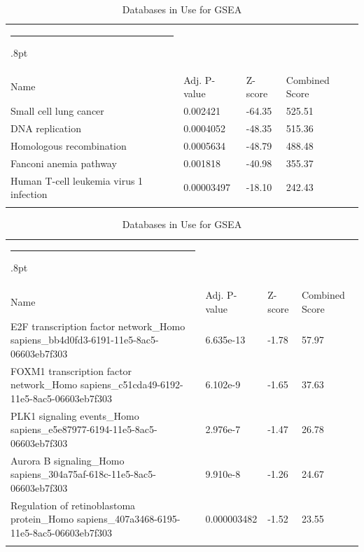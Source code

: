 \documentclass[3p,authoryear,preprint,12pt]{elsarticle}
\makeatletter
\def\hlinewd#1{%
  \noalign{\ifnum0=`}\fi\hrule \@height #1%
  \futurelet\reserved@a\@xhline}
\def\tbltoprule{\hlinewd{.8pt}\\[-12pt]}
\def\tblbottomrule{\noalign{\vspace*{6pt}}\hline\noalign{\vspace*{2pt}}}
\def\tblmidrule{\noalign{\vspace*{6pt}}\hline\noalign{\vspace*{2pt}}}
\makeatother
\begin{document}
\begin{table}[!htbp]
	\caption{{Databases in Use for GSEA} }
	\label{tw-de478ae31cc6}
	\def\arraystretch{1}
	\ignorespaces 
	\centering 
	\begin{tabulary}{\linewidth}{p{\dimexpr.65\tabcolsep}p{\dimexpr.15\tabcolsep}p{\dimexpr.1\tabcolsep}p{\dimexpr.1\tabcolsep}}
		\tbltoprule Name & Adj. P-value & Z-score & Combined Score\\
		\tblmidrule
Small cell lung cancer & 0.002421 & -64.35 & 525.51 \\
DNA replication & 0.0004052 & -48.35 & 515.36 \\
Homologous recombination & 0.0005634 & -48.79 & 488.48 \\
Fanconi anemia pathway & 0.001818 & -40.98 & 355.37 \\
Human T-cell leukemia virus 1 infection & 0.00003497 & -18.10 & 242.43 \\
		\tblbottomrule
	\end{tabulary}\par 
\end{table}
\begin{table}[!htbp]
	\caption{{Databases in Use for GSEA} }
	\label{tw-de478ae31cc6}
	\def\arraystretch{1}
	\ignorespaces 
	\centering 
	\begin{tabulary}{\linewidth}{p{\dimexpr.65\tabcolsep}p{\dimexpr.15\tabcolsep}p{\dimexpr.1\tabcolsep}p{\dimexpr.1\tabcolsep}}
		\tbltoprule Name & Adj. P-value & Z-score & Combined Score\\
		\tblmidrule
E2F transcription factor network\_Homo sapiens\_bb4d0fd3-6191-11e5-8ac5-06603eb7f303 & 6.635e-13 & -1.78 & 57.97 \\
FOXM1 transcription factor network\_Homo sapiens\_c51cda49-6192-11e5-8ac5-06603eb7f303 & 6.102e-9 & -1.65 & 37.63 \\
PLK1 signaling events\_Homo sapiens\_e5e87977-6194-11e5-8ac5-06603eb7f303 & 2.976e-7 & -1.47 & 26.78 \\
Aurora B signaling\_Homo sapiens\_304a75af-618c-11e5-8ac5-06603eb7f303 & 9.910e-8 & -1.26 & 24.67 \\
Regulation of retinoblastoma protein\_Homo sapiens\_407a3468-6195-11e5-8ac5-06603eb7f303 & 0.000003482 & -1.52 & 23.55 \\
		\tblbottomrule
	\end{tabulary}\par 
\end{table}
\end{document}
